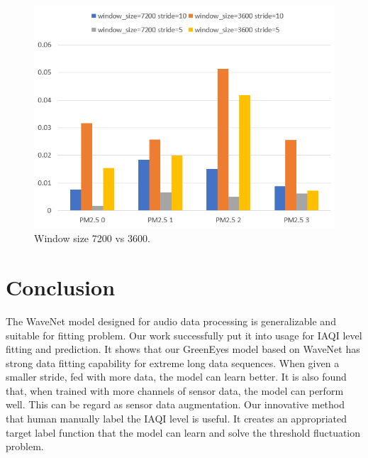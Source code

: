 \documentclass[sigconf]{acmart}
\begin{document}
\begin{figure}[!htbp]
    \centering
    \includegraphics[width=0.8\linewidth]{fig/results/ablation/window_size3600_train_mse.png}
    \caption{Window size 7200 vs 3600.}
    \label{fig:window_size3600_train_mse}
\end{figure}


\section{Conclusion}

The WaveNet model designed for audio data processing is generalizable and suitable for fitting problem. Our work successfully put it into usage for IAQI level fitting and prediction. It shows that our GreenEyes model based on WaveNet has strong data fitting capability for extreme long data sequences. When given a smaller stride, fed with more data, the model can learn better. It is also found that, when trained with more channels of sensor data, the model can perform well. This can be regard as sensor data augmentation. Our innovative method that human manually label the IAQI level is useful. It creates an appropriated target label function that the model can learn and solve the threshold fluctuation problem.


\end{document}
